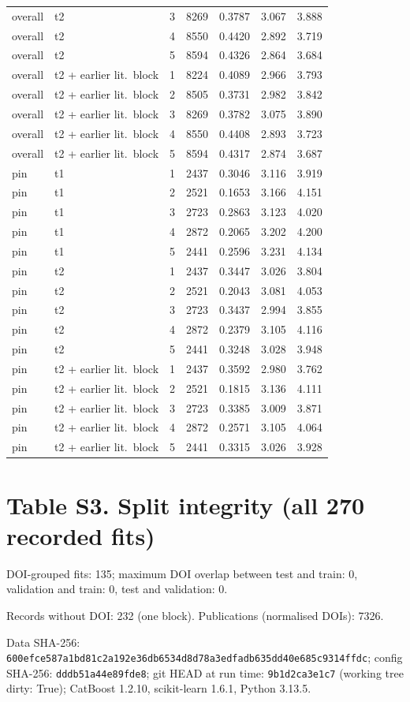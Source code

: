 \documentclass[10pt]{article}
\begin{document}
\begin{longtable}{lllrrrr}
overall & t2 & 3 & 8269 & 0.3787 & 3.067 & 3.888\\
overall & t2 & 4 & 8550 & 0.4420 & 2.892 & 3.719\\
overall & t2 & 5 & 8594 & 0.4326 & 2.864 & 3.684\\
overall & t2 + earlier lit.\ block & 1 & 8224 & 0.4089 & 2.966 & 3.793\\
overall & t2 + earlier lit.\ block & 2 & 8505 & 0.3731 & 2.982 & 3.842\\
overall & t2 + earlier lit.\ block & 3 & 8269 & 0.3782 & 3.075 & 3.890\\
overall & t2 + earlier lit.\ block & 4 & 8550 & 0.4408 & 2.893 & 3.723\\
overall & t2 + earlier lit.\ block & 5 & 8594 & 0.4317 & 2.874 & 3.687\\
pin & t1 & 1 & 2437 & 0.3046 & 3.116 & 3.919\\
pin & t1 & 2 & 2521 & 0.1653 & 3.166 & 4.151\\
pin & t1 & 3 & 2723 & 0.2863 & 3.123 & 4.020\\
pin & t1 & 4 & 2872 & 0.2065 & 3.202 & 4.200\\
pin & t1 & 5 & 2441 & 0.2596 & 3.231 & 4.134\\
pin & t2 & 1 & 2437 & 0.3447 & 3.026 & 3.804\\
pin & t2 & 2 & 2521 & 0.2043 & 3.081 & 4.053\\
pin & t2 & 3 & 2723 & 0.3437 & 2.994 & 3.855\\
pin & t2 & 4 & 2872 & 0.2379 & 3.105 & 4.116\\
pin & t2 & 5 & 2441 & 0.3248 & 3.028 & 3.948\\
pin & t2 + earlier lit.\ block & 1 & 2437 & 0.3592 & 2.980 & 3.762\\
pin & t2 + earlier lit.\ block & 2 & 2521 & 0.1815 & 3.136 & 4.111\\
pin & t2 + earlier lit.\ block & 3 & 2723 & 0.3385 & 3.009 & 3.871\\
pin & t2 + earlier lit.\ block & 4 & 2872 & 0.2571 & 3.105 & 4.064\\
pin & t2 + earlier lit.\ block & 5 & 2441 & 0.3315 & 3.026 & 3.928\\
\bottomrule\end{longtable}
\section*{Table S3. Split integrity (all 270 recorded fits)}
DOI-grouped fits: 135; maximum DOI overlap between test and train: 0, validation and train: 0, test and validation: 0.\par
Records without DOI: 232 (one block). Publications (normalised DOIs): 7326.\par
Data SHA-256: \texttt{600efce587a1bd81c2a192e36db6534d8d78a3edfadb635dd40e685c9314ffdc}; config SHA-256: \texttt{dddb51a44e89fde8}; git HEAD at run time: \texttt{9b1d2ca3e1c7} (working tree dirty: True); CatBoost 1.2.10, scikit-learn 1.6.1, Python 3.13.5.\par
\end{document}
